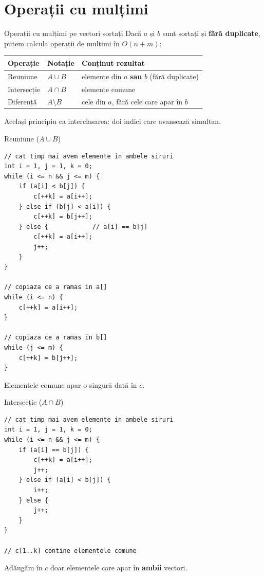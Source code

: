 ﻿\documentclass{beamer}
\begin{document}
\section{Operații cu mulțimi}

\begin{frame}{Operații cu mulțimi pe vectori sortați}
  Dacă $a$ și $b$ sunt sortați și \textbf{fără duplicate}, putem calcula operații de mulțimi în $O(n+m)$:

  \begin{center}
  \begin{tabular}{lll}
    \toprule
    Operație & Notație & Conținut rezultat \\
    \midrule
    Reuniune    & $A \cup B$ & elemente din $a$ \textbf{sau} $b$ (fără duplicate) \\
    Intersecție & $A \cap B$ & elemente comune \\
    Diferență   & $A \setminus B$ & cele din $a$, fără cele care apar în $b$ \\
    \bottomrule
  \end{tabular}
  \end{center}

  \smallskip
  Același principiu ca interclasarea: doi indici care avansează simultan.
\end{frame}

\begin{frame}{Reuniune ($A \cup B$)}
  \begin{lstlisting}
// cat timp mai avem elemente in ambele siruri
int i = 1, j = 1, k = 0;
while (i <= n && j <= m) {
    if (a[i] < b[j]) {
        c[++k] = a[i++];
    } else if (b[j] < a[i]) {
        c[++k] = b[j++];
    } else {            // a[i] == b[j]
        c[++k] = a[i++];
        j++;
    }
}

// copiaza ce a ramas in a[]
while (i <= n) {
    c[++k] = a[i++];
}

// copiaza ce a ramas in b[]
while (j <= m) {
    c[++k] = b[j++];
}
  \end{lstlisting}
  Elementele comune apar o singură dată în $c$.
\end{frame}

\begin{frame}[fragile]{Intersecție ($A \cap B$)}
  \begin{lstlisting}
// cat timp mai avem elemente in ambele siruri
int i = 1, j = 1, k = 0;
while (i <= n && j <= m) {
    if (a[i] == b[j]) {
        c[++k] = a[i++];
        j++;
    } else if (a[i] < b[j]) {
        i++;
    } else {
        j++;
    }
}

// c[1..k] contine elementele comune
  \end{lstlisting}
  Adăugăm în $c$ doar elementele care apar în \textbf{ambii} vectori.
\end{frame}
\end{document}
